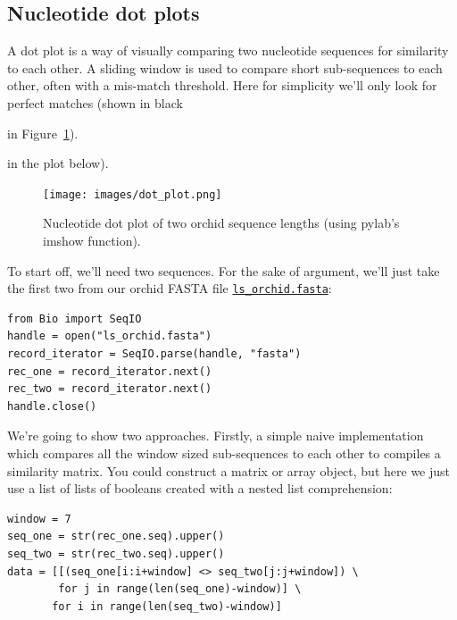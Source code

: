 \documentclass{report}
\begin{document}
\subsection{Nucleotide dot plots}
A dot plot is a way of visually comparing two nucleotide sequences for similarity to
each other.  A sliding window is used to compare short sub-sequences to each other,
often with a mis-match threshold.  Here for simplicity we'll only look for perfect
matches (shown in black
\begin{latexonly}
in Figure~\ref{fig:nuc-dot-plot}).
\end{latexonly}
\begin{htmlonly}
in the plot below).
\end{htmlonly}

%
%
\begin{latexonly}
\begin{figure}[htbp]
\centering
\texttt{[image: images/dot\_plot.png]}
\caption{Nucleotide dot plot of two orchid sequence lengths (using pylab's imshow function).}
\label{fig:nuc-dot-plot}
\end{figure}
\end{latexonly}

To start off, we'll need two sequences.  For the sake of argument, we'll just take
the first two from our orchid FASTA file \href{http://biopython.org/DIST/docs/tutorial/examples/ls_orchid.fasta}{\tt ls\_orchid.fasta}:

\begin{verbatim}
from Bio import SeqIO
handle = open("ls_orchid.fasta")
record_iterator = SeqIO.parse(handle, "fasta")
rec_one = record_iterator.next()
rec_two = record_iterator.next()
handle.close()
\end{verbatim}

We're going to show two approaches.  Firstly, a simple naive implementation
which compares all the window sized sub-sequences to each other to compiles a
similarity matrix.  You could construct a matrix or array object, but here we
just use a list of lists of booleans created with a nested list
comprehension:

\begin{verbatim}
window = 7
seq_one = str(rec_one.seq).upper()
seq_two = str(rec_two.seq).upper()
data = [[(seq_one[i:i+window] <> seq_two[j:j+window]) \
        for j in range(len(seq_one)-window)] \
       for i in range(len(seq_two)-window)]
\end{verbatim}
\end{document}
